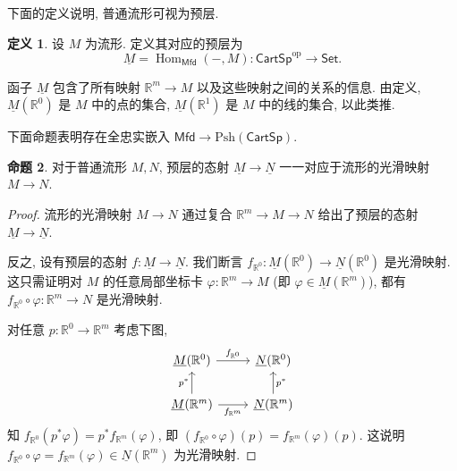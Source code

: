 \documentclass{article}
\theoremstyle{definition}
\newtheorem{definition}{定义}[section]
\newtheorem{prop}[definition]{命题}
\newcommand{\CartSp}{\mathsf{CartSp}}
\newcommand{\Set}{\mathsf{Set}}
\newcommand{\Mfd}{\mathsf{Mfd}}
\newcommand{\op}{\mathrm{op}}
\newcommand{\Psh}{\mathrm{Psh}}
\begin{document}
	下面的定义说明, 普通流形可视为预层.
	
	\begin{definition}
		设 $M$ 为流形. 定义其对应的预层为 $$\underline{M}=\operatorname{Hom}_{\Mfd}(-,M)\colon \CartSp^\op\to\Set.$$
	\end{definition}
	
	函子 $\underline{M}$ 包含了所有映射 $\mathbb{R}^m\to M$ 以及这些映射之间的关系的信息. 由定义, $\underline{M}(\mathbb{R}^0)$ 是 $M$ 中的点的集合, $\underline{M}(\mathbb{R}^1)$ 是 $M$ 中的线的集合, 以此类推.
	
	下面命题表明存在全忠实嵌入 $\Mfd\to\Psh(\CartSp)$.
	
	\begin{prop}
		对于普通流形 $M,N$, 预层的态射 $\underline{M}\to \underline{N}$
		一一对应于流形的光滑映射 $M\to N$.
	\end{prop}
	\begin{proof}
		流形的光滑映射 $M\to N$ 通过复合 $\mathbb{R}^m\to M\to N$ 给出了预层的态射 $\underline{M}\to \underline{N}$.
		
		反之, 设有预层的态射 $f\colon \underline{M}\to \underline{N}$.
		我们断言 $f_{\mathbb{R}^0}\colon \underline{M}(\mathbb{R}^0)\to \underline{N}(\mathbb{R}^0)$ 是光滑映射.
		这只需证明对 $M$ 的任意局部坐标卡 $\varphi\colon \mathbb{R}^m\to M$ (即 $\varphi\in \underline{M}(\mathbb{R}^m)$), 都有 $f_{\mathbb{R}^0}\circ\varphi\colon \mathbb{R}^m\to N$ 是光滑映射.
		
		对任意 $p\colon \mathbb{R}^0\to\mathbb{R}^m$ 考虑下图,
		\[\begin{tikzcd}[ampersand replacement=\&]
			{\underline{M}(\mathbb{R}^0)} \& {\underline{N}(\mathbb{R}^0)} \\
			{\underline{M}(\mathbb{R}^m)} \& {\underline{N}(\mathbb{R}^m)}
			\arrow["{f_{\mathbb{R}^0}}", from=1-1, to=1-2]
			\arrow["{p^*}", from=2-1, to=1-1]
			\arrow["{f_{\mathbb{R}^m}}"', from=2-1, to=2-2]
			\arrow["{p^*}"', from=2-2, to=1-2]
		\end{tikzcd}\]
		知 $f_{\mathbb{R}^0}(p^*\varphi) = p^*f_{\mathbb{R}^m}(\varphi)$, 即 $(f_{\mathbb{R}^0}\circ\varphi) (p)=f_{\mathbb{R}^m}(\varphi)(p)$. 这说明 $f_{\mathbb{R}^0}\circ\varphi = f_{\mathbb{R}^m}(\varphi)\in \underline{N}(\mathbb{R}^m)$ 为光滑映射.
	\end{proof}
	
\end{document}
